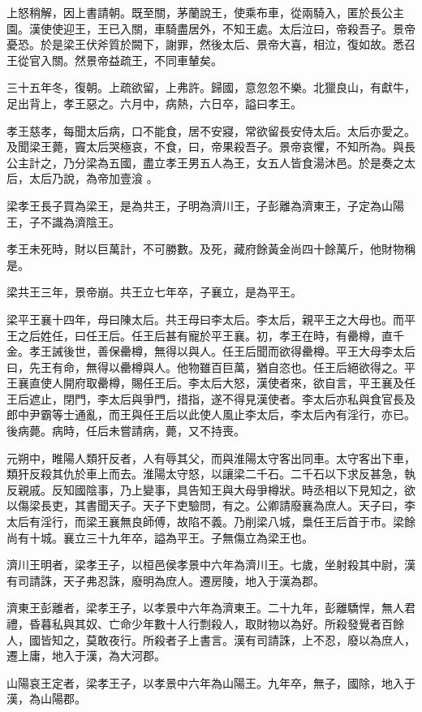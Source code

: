 上怒稍解，因上書請朝。既至關，茅蘭說王，使乘布車，從兩騎入，匿於長公主園。漢使使迎王，王已入關，車騎盡居外，不知王處。太后泣曰，帝殺吾子。景帝憂恐。於是梁王伏斧質於闕下，謝罪，然後太后、景帝大喜，相泣，復如故。悉召王從官入關。然景帝益疏王，不同車輦矣。

三十五年冬，復朝。上疏欲留，上弗許。歸國，意忽忽不樂。北獵良山，有獻牛，足出背上，孝王惡之。六月中，病熱，六日卒，謚曰孝王。

孝王慈孝，每聞太后病，口不能食，居不安寢，常欲留長安侍太后。太后亦愛之。及聞梁王薨，竇太后哭極哀，不食，曰，帝果殺吾子。景帝哀懼，不知所為。與長公主計之，乃分梁為五國，盡立孝王男五人為王，女五人皆食湯沐邑。於是奏之太后，太后乃說，為帝加壹湌 。

梁孝王長子買為梁王，是為共王，子明為濟川王，子彭離為濟東王，子定為山陽王，子不識為濟陰王。

孝王未死時，財以巨萬計，不可勝數。及死，藏府餘黃金尚四十餘萬斤，他財物稱是。

梁共王三年，景帝崩。共王立七年卒，子襄立，是為平王。

梁平王襄十四年，母曰陳太后。共王母曰李太后。李太后，親平王之大母也。而平王之后姓任，曰任王后。任王后甚有寵於平王襄。初，孝王在時，有罍樽，直千金。孝王誡後世，善保罍樽，無得以與人。任王后聞而欲得罍樽。平王大母李太后曰，先王有命，無得以罍樽與人。他物雖百巨萬，猶自恣也。任王后絕欲得之。平王襄直使人開府取罍樽，賜任王后。李太后大怒，漢使者來，欲自言，平王襄及任王后遮止，閉門，李太后與爭門，措指，遂不得見漢使者。李太后亦私與食官長及郎中尹霸等士通亂，而王與任王后以此使人風止李太后，李太后內有淫行，亦已。後病薨。病時，任后未嘗請病，薨，又不持喪。

元朔中，睢陽人類犴反者，人有辱其父，而與淮陽太守客出同車。太守客出下車，類犴反殺其仇於車上而去。淮陽太守怒，以讓梁二千石。二千石以下求反甚急，執反親戚。反知國陰事，乃上變事，具告知王與大母爭樽狀。時丞相以下見知之，欲以傷梁長吏，其書聞天子。天子下吏驗問，有之。公卿請廢襄為庶人。天子曰，李太后有淫行，而梁王襄無良師傅，故陷不義。乃削梁八城，梟任王后首于市。梁餘尚有十城。襄立三十九年卒，謚為平王。子無傷立為梁王也。

濟川王明者，梁孝王子，以桓邑侯孝景中六年為濟川王。七歲，坐射殺其中尉，漢有司請誅，天子弗忍誅，廢明為庶人。遷房陵，地入于漢為郡。

濟東王彭離者，梁孝王子，以孝景中六年為濟東王。二十九年，彭離驕悍，無人君禮，昏暮私與其奴、亡命少年數十人行剽殺人，取財物以為好。所殺發覺者百餘人，國皆知之，莫敢夜行。所殺者子上書言。漢有司請誅，上不忍，廢以為庶人，遷上庸，地入于漢，為大河郡。

山陽哀王定者，梁孝王子，以孝景中六年為山陽王。九年卒，無子，國除，地入于漢，為山陽郡。

